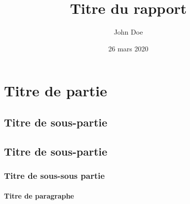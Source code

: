 \documentclass[nantes]{uge-report}              %
\title{Titre du rapport}                        %
\author{John Doe}                               %
\date{26 mars 2020}                             %
\begin{document}
\maketitle

\tableofcontents

\section{Titre de partie}
\subsection{Titre de sous-partie}

\lipsum[1-2]

\subsection{Titre de sous-partie}
\lipsum[3]
\subsubsection{Titre de sous-sous partie}
\lipsum[4-6]

\paragraph{Titre de paragraphe}
\lipsum[7]
\end{document}
